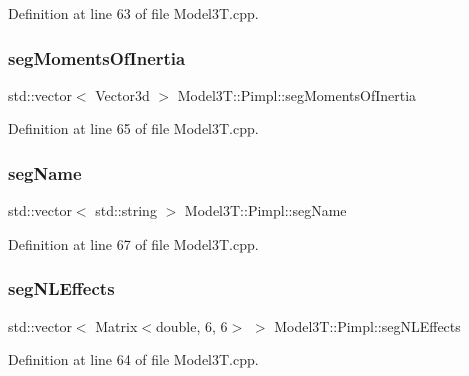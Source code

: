 Definition at line 63 of file Model3\+T.\+cpp.

\hypertarget{structModel3T_1_1Pimpl_a4c64f2048ff9ce34719e3ea2a384a263}{}\label{structModel3T_1_1Pimpl_a4c64f2048ff9ce34719e3ea2a384a263} 
\subsubsection{\texorpdfstring{seg\+Moments\+Of\+Inertia}{segMomentsOfInertia}}
{\footnotesize\ttfamily std\+::vector$<$ Vector3d $>$ Model3\+T\+::\+Pimpl\+::seg\+Moments\+Of\+Inertia}



Definition at line 65 of file Model3\+T.\+cpp.

\hypertarget{structModel3T_1_1Pimpl_a2cab0a9da7f7c37d10152cac8c8e6cfc}{}\label{structModel3T_1_1Pimpl_a2cab0a9da7f7c37d10152cac8c8e6cfc} 
\subsubsection{\texorpdfstring{seg\+Name}{segName}}
{\footnotesize\ttfamily std\+::vector$<$ std\+::string $>$ Model3\+T\+::\+Pimpl\+::seg\+Name}



Definition at line 67 of file Model3\+T.\+cpp.

\hypertarget{structModel3T_1_1Pimpl_a13b0782e9a8fb952f2fa33227277102f}{}\label{structModel3T_1_1Pimpl_a13b0782e9a8fb952f2fa33227277102f} 
\subsubsection{\texorpdfstring{seg\+N\+L\+Effects}{segNLEffects}}
{\footnotesize\ttfamily std\+::vector$<$ Matrix$<$double, 6, 6$>$ $>$ Model3\+T\+::\+Pimpl\+::seg\+N\+L\+Effects}



Definition at line 64 of file Model3\+T.\+cpp.

\hypertarget{structModel3T_1_1Pimpl_a95a2564c9002bdb208279d591fca70ad}{}\label{structModel3T_1_1Pimpl_a95a2564c9002bdb208279d591fca70ad} 

